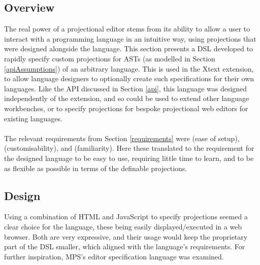 \documentclass{article}
\begin{document}
{\subsection{Overview}
The real power of a projectional editor stems from its ability to allow a user to interact with a programming language in an intuitive way, using projections that were designed alongside the language. This section presents a DSL developed to rapidly specify custom projections for ASTs (as modelled in Section \ref{apiAssumptions}) of an arbitrary language. This is used in the Xtext extension, to allow language designers to optionally create such specifications for their own languages. Like the API discussed in Section \ref{api}, this language was designed independently of the extension, and so could be used to extend other language workbenches, or to specify projections for bespoke projectional web editors for existing languages.
\\
\\
The relevant requirements from Section \ref{requirements} were \RSetup (ease of setup), \RCustom (customisability), and \RFamiliarity (familiarity). Here these translated to the requirement for the designed language to be easy to use, requiring little time to learn, and to be as flexible as possible in terms of the definable projections.

\subsection{Design}

Using a combination of HTML and JavaScript to specify projections seemed a clear choice for the language, these being easily displayed/executed in a web browser. Both are very expressive, and their usage would keep the proprietary part of the DSL smaller, which aligned with the language's requirements. For further inspiration, MPS's editor specification language was examined.

}
\end{document}
